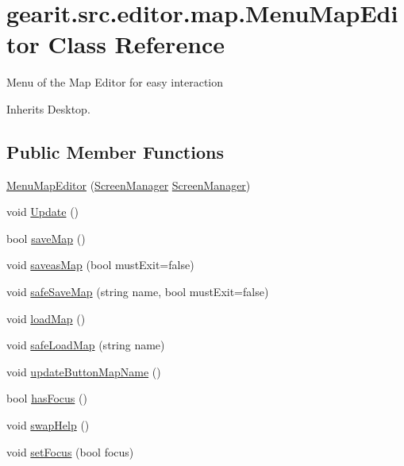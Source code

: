 \hypertarget{classgearit_1_1src_1_1editor_1_1map_1_1_menu_map_editor}{\section{gearit.\+src.\+editor.\+map.\+Menu\+Map\+Editor Class Reference}
\label{classgearit_1_1src_1_1editor_1_1map_1_1_menu_map_editor}
}


Menu of the Map Editor for easy interaction  




Inherits Desktop.

\subsection*{Public Member Functions}
\begin{DoxyCompactItemize}
\item 
\hyperlink{classgearit_1_1src_1_1editor_1_1map_1_1_menu_map_editor_ae0cb858d977d428a381d73a077ab7ef9}{Menu\+Map\+Editor} (\hyperlink{classgearit_1_1xna_1_1_screen_manager}{Screen\+Manager} \hyperlink{classgearit_1_1xna_1_1_screen_manager}{Screen\+Manager})
\item 
void \hyperlink{classgearit_1_1src_1_1editor_1_1map_1_1_menu_map_editor_a4327e2c92caa66fe705b0427a87a0f4a}{Update} ()
\item 
bool \hyperlink{classgearit_1_1src_1_1editor_1_1map_1_1_menu_map_editor_a3e9a425cb64e1ee47ea9d9a72833de46}{save\+Map} ()
\item 
void \hyperlink{classgearit_1_1src_1_1editor_1_1map_1_1_menu_map_editor_a08a8c9769958de4d39bcd6844c9382eb}{saveas\+Map} (bool must\+Exit=false)
\item 
void \hyperlink{classgearit_1_1src_1_1editor_1_1map_1_1_menu_map_editor_a4831ba3548a1bf23798384c65757f1f1}{safe\+Save\+Map} (string name, bool must\+Exit=false)
\item 
void \hyperlink{classgearit_1_1src_1_1editor_1_1map_1_1_menu_map_editor_a274f68537473750f3fbc8e845718f8d6}{load\+Map} ()
\item 
void \hyperlink{classgearit_1_1src_1_1editor_1_1map_1_1_menu_map_editor_a195fa3425f212cf6e85c15aad66e321e}{safe\+Load\+Map} (string name)
\item 
void \hyperlink{classgearit_1_1src_1_1editor_1_1map_1_1_menu_map_editor_a9ca206ed79c3174880943a1946be9571}{update\+Button\+Map\+Name} ()
\item 
bool \hyperlink{classgearit_1_1src_1_1editor_1_1map_1_1_menu_map_editor_ad336db68100fba294a888f6b9041f85e}{has\+Focus} ()
\item 
void \hyperlink{classgearit_1_1src_1_1editor_1_1map_1_1_menu_map_editor_ae2d1bb2a2157e2abfcafd181914d5ce3}{swap\+Help} ()
\item 
void \hyperlink{classgearit_1_1src_1_1editor_1_1map_1_1_menu_map_editor_abf4a6617420407421450f729c3b1c9e1}{set\+Focus} (bool focus)
\end{DoxyCompactItemize}
